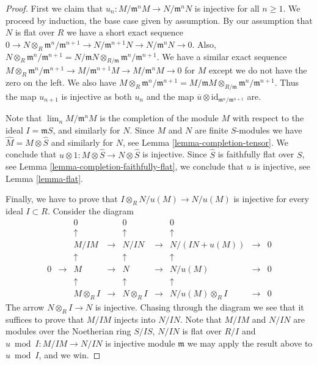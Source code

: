 \begin{proof}
First we claim that $u_n : M/{\mathfrak m}^nM \to N/{\mathfrak m}^nN$ 
is injective for all $n \geq 1$. We proceed by induction, the base
case given by assumption. By our assumption that $N$ is flat
over $R$ we have  a short exact sequence
$0 \to N\otimes_R {\mathfrak m}^n/{\mathfrak m}^{n+1}
\to N/{\mathfrak m}^{n+1}N \to N/{\mathfrak m}^n N\to 0$.
Also, $N\otimes_R {\mathfrak m}^n/{\mathfrak m}^{n+1}
= N/{\mathfrak m}N \otimes_{R/{\mathfrak m}}
{\mathfrak m}^n/{\mathfrak m}^{n+1}$. We have 
a similar exact sequence $M\otimes_R {\mathfrak m}^n/{\mathfrak m}^{n+1}
\to M/{\mathfrak m}^{n+1}M \to M/{\mathfrak m}^n M\to 0$
for $M$ except we do not have the zero on the left. We also
have $M\otimes_R {\mathfrak m}^n/{\mathfrak m}^{n+1}
= M/{\mathfrak m}M \otimes_{R/{\mathfrak m}}
{\mathfrak m}^n/{\mathfrak m}^{n+1}$. Thus the map $u_{n+1}$ is
injective as both $u_n$ and the map
$\overline{u}\otimes \text{id}_{{\mathfrak m}^n/{\mathfrak m}^{n+1}}$ are.

\medskip\noindent
Note that $\lim_n M/{\mathfrak m}^nM$ is the completion
of the module $M$ with respect to the ideal $I = {\mathfrak m}S$,
and similarly for $N$. Since $M$ and $N$ are finite $S$-modules
we have $\hat M = M \otimes \hat S$ and similarly for $N$, see Lemma
\ref{lemma-completion-tensor}.
We conclude that $u \otimes 1 : M \otimes \hat S
\to N \otimes \hat S$ is injective. Since $\hat S$ is faithfully
flat over $S$, see Lemma \ref{lemma-completion-faithfully-flat},
we conclude that $u$ is injective, see Lemma \ref{lemma-flat}.

\medskip\noindent
Finally, we have to prove that $I \otimes_R N/u(M) \to N/u(M)$
is injective for every ideal $I \subset R$. Consider the diagram
$$
\begin{matrix}
&
&
0
&
&
0
&
&
0
&
&
\\
&
&
\uparrow
&
&
\uparrow
&
&
\uparrow
&
&
\\
&
&
M/IM
&
\to
&
N/IN
&
\to
&
N/(IN+u(M))
&
\to
&
0
\\
&
&
\uparrow
&
&
\uparrow
&
&
\uparrow
&
&
\\
0
&
\to
&
M
&
\to
&
N
&
\to
&
N/u(M)
&
\to
&
0
\\
&
&
\uparrow
&
&
\uparrow
&
&
\uparrow
&
&
\\
&
&
M \otimes_R I
&
\to
&
N \otimes_R I
&
\to
&
N/u(M)\otimes_R I
&
\to
&
0
\end{matrix}
$$
The arrow $N\otimes_R I \to N$ is injective.
Chasing through the diagram we see 
that it suffices to prove that
$M/IM$ injects into $N/IN$.
Note that $M/IM$ and $N/IN$ are modules
over the Noetherian ring $S/IS$,
$N/IN$ is flat over $R/I$ and
$u \bmod I : M/IM \to N/IN$ is injective
module $\mathfrak m$ we may apply
the result above to $u \bmod I$, and we win.
\end{proof}


